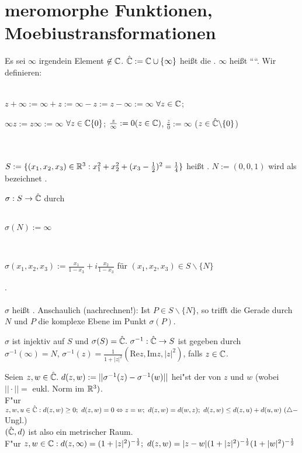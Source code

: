 \documentclass[a4paper,twoside,DIV15,BCOR12mm]{scrbook}
\begin{document}
\chapter{meromorphe Funktionen, Moebiustransformationen}
\begin{definition}
Es sei $\infty$ irgendein Element $\not \in \mathbb{C}$. $\hat{\mathbb{C}} := \mathbb{C} \cup \{ \infty
\}$ heißt die . $\infty$ heißt ````. Wir definieren: \\ \\
\centerline{$z + \infty := \infty + z := \infty -z := z - \infty := \infty$
$\forall z \in \mathbb{C}$;} \centerline{$\infty z := z \infty := \infty$ $\forall z \in \mathbb{C}
\{0\}$; $\frac{z}{\infty} := 0 (z \in \mathbb{C})$, $\frac{z}{0}:= \infty$ ($ z \in
\hat{\mathbb{C}} \backslash \{0\} $)}\\ \\
$S := \{ (x_1, x_2, x_3) \in \mathbb{R}^3: x_1^2+ x_2^2 + (x_3 - \frac{1}{2})^2 =
\frac{1}{4}\}$ heißt . $N := (0,0,1)$ wird als
 bezeichnet .
\end{definition}

\begin{definition}
$\sigma: S \to \hat{\mathbb{C}}$ durch \\ \\
\centerline{$\sigma(N) := \infty$} \\
\centerline{$\sigma(x_1, x_2, x_3) := \frac{x_1}{1-x_3} + i \frac{x_2}{1-x_3}$ für
$(x_1,x_2,x_3) \in S \backslash \{N\}$}. \\ \\
$\sigma$ heißt . Anschaulich
(nachrechnen!): Ist $P \in S \backslash \{N\}$, so trifft die Gerade durch $N$ und $P$
die komplexe Ebene im Punkt $\sigma(P)$.
\end{definition}

\begin{satz}
$\sigma$ ist injektiv auf $S$ und $\sigma(S) = \hat{\mathbb{C}}.\ \sigma^{-1}:
\hat{\mathbb{C}} \to S$ ist gegeben durch \\ $\sigma^{-1}(\infty) = N$, $\sigma^{-1}(z) =
\frac{1}{1+ |z|^2}(\text{Re} z, \text{Im} z, |z|^2)$, falls $z \in \mathbb{C}$.
\end{satz}
%
%
%

\begin{satz}
Seien $z,w \in \hat{\mathbb{C}}.\ d(z,w):= || \sigma^{-1}(z) - \sigma^{-1}(w) ||$ hei"st der  von $z$ und $w$ (wobei $||\cdot| |=$ eukl. Norm im $\mathbb{R}^3)$.\\
F"ur $z,w,u \in \hat{\MdC}: d(z,w) \geq 0;\ d(z,w)=0 \Leftrightarrow z=w;\ d(z,w)=d(w,z);\ d(z,w) \leq d(z,u) + d(u,w)\ (\triangle-$Ungl.)\\
$(\hat{\mathbb{C}},d)$ ist also ein metrischer Raum.\\
F"ur $z,w \in \mathbb{C}: d(z,\infty) = (1+|z|^2)^{-\frac12};\ d(z,w) = |z-w|(1+|z|^2)^{-\frac12}(1+|w|^2)^{-\frac12}$
\end{satz}
\end{document}
